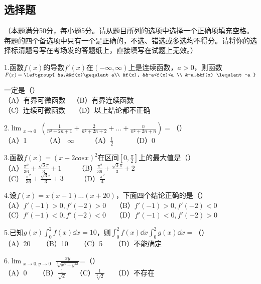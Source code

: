 
\begin{issues}
\issueDraft
\end{issues}

\subsection{选择题}（本题满分50分，每小题5分。请从题目所列的选项中选择一个正确项填充空格。每题的四个备选项中只有一个是正确的，不选、错选或多选均不得分。请将你的选择标清题号写在考场发的答题纸上，直接填写在试题上无效。）

1.函数$f(x)$的导数$f'(x)$在$(-\infty,\infty)$上是连续函数，$a>0$，则函数$F(x)=\leftgroup{
&a,&&f(x)\geqslant a\\ 
&f(x), &&-a<f(x)<a \\
&-a,&&f(x) \leqslant -a }$

一定是（）\\
（A）有界可微函数$\quad$（B）有界连续函数 \\
（C）连续可微函数$\quad$ （D）以上结论都不正确

2.$\displaystyle \lim_{\substack{x \to 0}}(\frac{1}{n^2+2n+1}+\frac{2}{n^2+2n+2}+\dots+\frac{n}{n^2+2n+n})=$（）\\
（A）1 $\qquad$ （A） $ \infty \qquad$  （A）$\frac{1}{2}$ $\qquad$   （D）0

3.函数$f(x)=(x+2cosx)^2$在区间$[0,\frac{\pi}{2}]$上的最大值是（）\\
（A）$\frac{\pi ^2}{36}+\frac{\sqrt{3}\pi}{3}+1 \qquad$     （B）$\frac{\pi ^2}{36}+\frac{\sqrt{3}\pi}{3}+2 \qquad$  \\
（C） $\frac{\pi ^2}{36}+\frac{\sqrt{3}\pi}{3}+3\qquad$       （D）$\frac{\pi^2}{4} \qquad$  

4.设$f(x)=x(x+1)\dots(x+20)$，下面四个结论正确的是（）\\
（A）$f'(-1)>0,f'(-2)>0\quad$ （B）$f'(-1)>0,f'(-2)<0\quad$ \\
（C）$f'(-1)<0,f'(-2)<0\quad$ （D）$f'(-1)<0,f'(-2)>0$

5.已知$\displaystyle g(x)\int_{0}^{2} f(x)\dd{x}=10$，则$\displaystyle \int_{0}^{2} f(x)\dd{x} \int_{0}^{2} g(x)\dd{x}=$（）\\
（A）20 $\quad$ （B）10 $\quad$ （C）5 $\quad$ （D）不能确定

6.$ \displaystyle \lim_{\substack{x \to 0,y \to 0}} \frac{xy}{\sqrt[3]{x^4+y^{12}}}$=（）\\
（A）0 $\quad$ （B）$\frac{1}{\sqrt{2}} \quad$ （C）$ \frac{1}{\sqrt[3]{2}}\quad$ （D）不存在  

